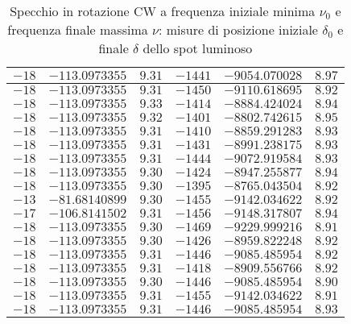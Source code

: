 \documentclass{article} %
\begin{document}
\begin{table}
\begin{tabular}{||c|c|c||c|c|c||}
            $-18 $ & $-113.0973355 $ & $ 9.31 $ & $ -1441 $ & $ -9054.070028 $ & $  8.97 $ \\\hline
            $-18 $ & $-113.0973355 $ & $ 9.31 $ & $ -1450 $ & $ -9110.618695 $ & $  8.92 $ \\\hline
            $-18 $ & $-113.0973355 $ & $ 9.33 $ & $ -1414 $ & $ -8884.424024 $ & $  8.94 $ \\\hline
            $-18 $ & $-113.0973355 $ & $ 9.32 $ & $ -1401 $ & $ -8802.742615 $ & $  8.95 $ \\\hline
            $-18 $ & $-113.0973355 $ & $ 9.31 $ & $ -1410 $ & $ -8859.291283 $ & $  8.93 $ \\\hline
            $-18 $ & $-113.0973355 $ & $ 9.31 $ & $ -1431 $ & $ -8991.238175 $ & $  8.93 $ \\\hline
            $-18 $ & $-113.0973355 $ & $ 9.31 $ & $ -1444 $ & $ -9072.919584 $ & $  8.93 $ \\\hline
            $-18 $ & $-113.0973355 $ & $ 9.30 $ & $ -1424 $ & $ -8947.255877 $ & $  8.94 $ \\\hline
            $-18 $ & $-113.0973355 $ & $ 9.30 $ & $ -1395 $ & $ -8765.043504 $ & $  8.92 $ \\\hline
            $-13 $ & $-81.68140899 $ & $ 9.30 $ & $ -1455 $ & $ -9142.034622 $ & $  8.92 $ \\\hline
            $-17 $ & $-106.8141502 $ & $ 9.31 $ & $ -1456 $ & $ -9148.317807 $ & $  8.94 $ \\\hline
            $-18 $ & $-113.0973355 $ & $ 9.30 $ & $ -1469 $ & $ -9229.999216 $ & $  8.91 $ \\\hline
            $-18 $ & $-113.0973355 $ & $ 9.30 $ & $ -1426 $ & $ -8959.822248 $ & $  8.92 $ \\\hline
            $-18 $ & $-113.0973355 $ & $ 9.31 $ & $ -1446 $ & $ -9085.485954 $ & $  8.92 $ \\\hline
            $-18 $ & $-113.0973355 $ & $ 9.31 $ & $ -1418 $ & $ -8909.556766 $ & $  8.92 $ \\\hline
            $-18 $ & $-113.0973355 $ & $ 9.30 $ & $ -1446 $ & $ -9085.485954 $ & $  8.90 $ \\\hline
            $-18 $ & $-113.0973355 $ & $ 9.31 $ & $ -1455 $ & $ -9142.034622 $ & $  8.91 $ \\\hline
            $-18 $ & $-113.0973355 $ & $ 9.31 $ & $ -1446 $ & $ -9085.485954 $ & $  8.93 $ \\\hline
        \end{tabular}
        \caption{Specchio in rotazione CW a frequenza iniziale minima $\nu_0$ e frequenza finale massima $\nu$: misure di posizione iniziale $\delta_0$ e finale $\delta$ dello spot luminoso}
        \label{CW_min_max-delta-omega}
    \end{table}
\end{document}
